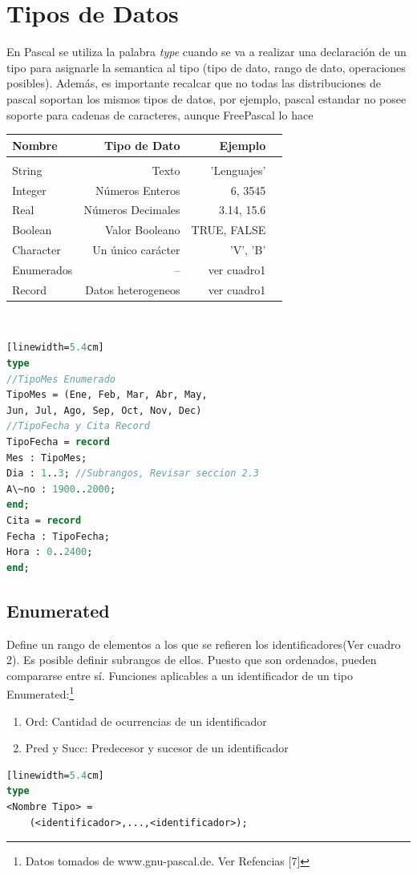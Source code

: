 \documentclass[10pt,journal,compsoc]{IEEEtran}
\begin{document}
\section{Tipos de Datos}
En Pascal se utiliza la palabra \emph{type} cuando se va a realizar una declaraci\'on de un tipo para asignarle la semantica al tipo (tipo de dato, rango de dato, operaciones posibles). Adem\'as, es importante recalcar que no todas las distribuciones de pascal soportan los mismos tipos de datos, por ejemplo, pascal estandar no posee soporte para cadenas de caracteres, aunque FreePascal lo hace 
\begin{tabular}{ l r r r }
	Nombre & Tipo de Dato & Ejemplo \\
	\hline\\
	String & Texto & 'Lenguajes'\\
	Integer & N\'umeros Enteros & 6, 3545 \\
	Real & N\'umeros Decimales & 3.14, 15.6\\
	Boolean & Valor Booleano & TRUE, FALSE \\
	Character & Un \'unico car\'acter & 'V', 'B'\\
	Enumerados &  -- & ver cuadro1\\
	Record & Datos heterogeneos & ver cuadro1\\
\end{tabular}\\\newline\newline\newline
\begin{lstlisting}[language=Pascal, caption = {C\'odigo de tipo de datos enumerados y de registro en Pascal}][linewidth=5.4cm]
type
//TipoMes Enumerado
TipoMes = (Ene, Feb, Mar, Abr, May, 
Jun, Jul, Ago, Sep, Oct, Nov, Dec)
//TipoFecha y Cita Record
TipoFecha = record
Mes : TipoMes;
Dia : 1..3; //Subrangos, Revisar seccion 2.3
A\~no : 1900..2000;
end;
Cita = record
Fecha : TipoFecha;
Hora : 0..2400;
end;
\end{lstlisting}

\subsection{Enumerated}
Define un rango de elementos a los que se refieren los identificadores(Ver cuadro 2). Es posible definir subrangos de ellos. Puesto que son ordenados, pueden compararse entre s\'i. Funciones aplicables a un identificador de un tipo Enumerated:\footnote{Datos tomados de www.gnu-pascal.de. Ver Refencias [7]}
\begin{enumerate}
	\item Ord: Cantidad de ocurrencias de un identificador
	\item Pred y Succ: Predecesor y sucesor de un identificador
\end{enumerate}
\begin{lstlisting}[language=Pascal, caption = {C\'odigo de declaraci\'on en enumerated}][linewidth=5.4cm]
type
<Nombre Tipo> = 
    (<identificador>,...,<identificador>);
\end{lstlisting}
\end{document}
